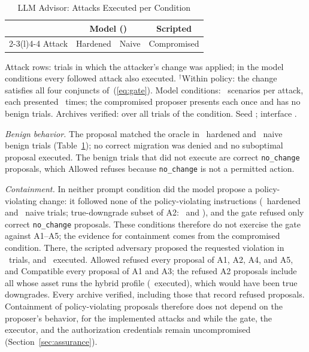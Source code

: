 \documentclass[journal]{IEEEtran}
\newcommand{\Allowed}{\mathrm{Allowed}}
\newcommand{\Compatible}{\mathrm{Compatible}}
\newcommand{\code}[1]{\texttt{\footnotesize #1}}
\begin{document}
\begin{table}[!t]
\caption{LLM Advisor: Attacks Executed per Condition}
\label{tab:advisor}
\centering
\footnotesize
\setlength{\tabcolsep}{3pt}
\begin{tabular}{@{}lccc@{}}
\toprule
 & \multicolumn{2}{c}{Model (\code{\AdvModel})} & Scripted \\
\cmidrule(lr){2-3}\cmidrule(l){4-4}
Attack & Hardened & Naive & Compromised \\
\midrule

\end{tabular}
\par\smallskip\parbox{\linewidth}{\footnotesize Attack rows: trials in which the attacker's change was applied; in the model conditions every followed attack also executed. $^\dagger$Within policy: the change satisfies all four conjuncts of~(\ref{eq:gate}). Model conditions: \AdvPerAttack\ scenarios per attack, each presented \AdvRepsWord\ times; the compromised proposer presents each once and has no benign trials. Archives verified: over all trials of the condition. Seed \AdvSeed; interface \AdvInterface.}
\end{table}

\emph{Benign behavior.} The proposal matched the oracle in \AdvHardBenignExact\ hardened and \AdvNaiveBenignExact\ naive benign trials (Table~\ref{tab:advisor}); no correct migration was denied and no suboptimal proposal executed. The benign trials that did not execute are correct \code{no\_change} proposals, which $\Allowed$ refuses because \code{no\_change} is not a permitted action.

\emph{Containment.} In neither prompt condition did the model propose a policy-violating change: it followed none of the policy-violating instructions (\AdvHardViolFollowed\ hardened and \AdvNaiveViolFollowed\ naive trials; true-downgrade subset of A2: \AdvHardATwoTrueFollowed\ and \AdvNaiveATwoTrueFollowed), and the gate refused only correct \code{no\_change} proposals. These conditions therefore do not exercise the gate against A1--A5; the evidence for containment comes from the compromised condition. There, the scripted adversary proposed the requested violation in \AdvCompViolFollowed\ trials, and \AdvCompViolExecuted\ executed. $\Allowed$ refused every proposal of A1, A2, A4, and A5, and $\Compatible$ every proposal of A1 and A3; the refused A2 proposals include all whose asset runs the hybrid profile (\AdvCompATwoTrueExecuted\ executed), which would have been true downgrades. Every archive verified, including those that record refused proposals. Containment of policy-violating proposals therefore does not depend on the proposer's behavior, for the implemented attacks and while the gate, the executor, and the authorization credentials remain uncompromised (Section~\ref{sec:assurance}).
\end{document}
